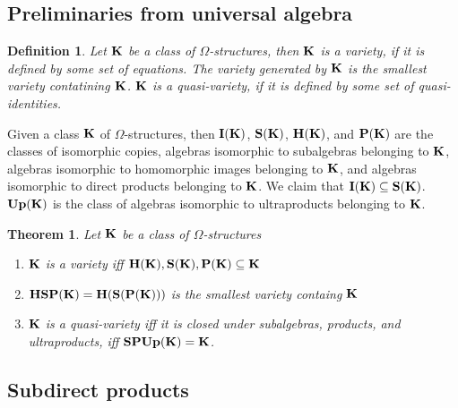 \documentclass[a4paper]{article}
\theoremstyle{defin}
\newtheorem{defin}{Definition}
\theoremstyle{theorem}
\newtheorem{theorem}{Theorem}
\theoremstyle{prop}
\theoremstyle{lemma}
\theoremstyle{ex}
\theoremstyle{col}
\begin{document}
\subsection{Preliminaries from universal algebra}

\begin{defin}
  Let ${\bf K}$ be a class of $\Omega$-structures, then ${\bf K}$ is a variety, if it is defined by some set of equations.
  The variety generated by ${\bf K}$ is the smallest variety contatining ${\bf K}$. ${\bf K}$ is a quasi-variety, if it is defined by some
  set of quasi-identities.
\end{defin}

Given a class ${\bf K}$ of $\Omega$-structures, then ${\bf I}({\bf K})$, ${\bf S}({\bf K})$, ${\bf H}({\bf K})$, and ${\bf P}({\bf K})$ are
the classes of isomorphic copies, algebras isomorphic to subalgebras belonging to ${\bf K}$,
algebras isomorphic to homomorphic images belonging to ${\bf K}$, and algebras isomorphic to direct products belonging to ${\bf K}$.
We claim that ${\bf I}({\bf K}) \subseteq {\bf S}({\bf K})$. ${\bf Up}({\bf K})$ is the class of algebras isomorphic to ultraproducts
belonging to ${\bf K}$.

\begin{theorem} Let ${\bf K}$ be a class of $\Omega$-structures

  \begin{enumerate}
    \item ${\bf K}$ is a variety iff ${\bf H}({\bf K}), {\bf S}({\bf K}), {\bf P}({\bf K}) \subseteq {\bf K}$
    \item ${\bf HSP}({\bf K}) = {\bf H}({\bf S}({\bf P}({\bf K})))$ is the smallest variety containg ${\bf K}$
    \item ${\bf K}$ is a quasi-variety iff it is closed under subalgebras, products, and ultraproducts, iff ${\bf SPUp}({\bf K}) = {\bf K}$.
  \end{enumerate}
\end{theorem}

\subsection{Subdirect products}
\end{document}
